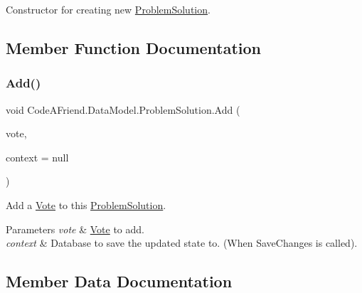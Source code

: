 Constructor for creating new \mbox{\hyperlink{class_code_a_friend_1_1_data_model_1_1_problem_solution}{Problem\+Solution}}.



\subsection{Member Function Documentation}
\mbox{\label{class_code_a_friend_1_1_data_model_1_1_problem_solution_a2c0f0f4da13003471346d3d2101c4e04}} 
\subsubsection{\texorpdfstring{Add()}{Add()}}
{\footnotesize\ttfamily void Code\+A\+Friend.\+Data\+Model.\+Problem\+Solution.\+Add (\begin{DoxyParamCaption}\item[{\mbox{\hyperlink{class_code_a_friend_1_1_data_model_1_1_vote}{Vote}}}]{vote,  }\item[{Db\+Context}]{context = {\ttfamily null} }\end{DoxyParamCaption})}



Add a \mbox{\hyperlink{class_code_a_friend_1_1_data_model_1_1_vote}{Vote}} to this \mbox{\hyperlink{class_code_a_friend_1_1_data_model_1_1_problem_solution}{Problem\+Solution}}. 


\begin{DoxyParams}{Parameters}
{\em vote} & \mbox{\hyperlink{class_code_a_friend_1_1_data_model_1_1_vote}{Vote}} to add.\\
\hline
{\em context} & Database to save the updated state to. (When Save\+Changes is called).\\
\hline
\end{DoxyParams}


\subsection{Member Data Documentation}
\mbox{\label{class_code_a_friend_1_1_data_model_1_1_problem_solution_a6012ce280fdad237001766fb95a204ab}} 
